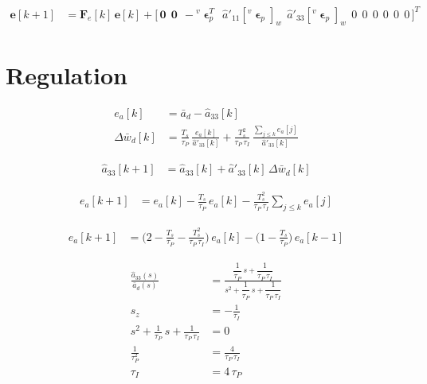 \documentclass[11pt,a4paper]{ctexart}
\newcommand{\T}{T}
\newcommand{\vep}{{}^{v}\bm{\upvarepsilon}_p}
\begin{document}
\vspace{1.2em}
\begin{align*}
\mathbf e[k+1] &= \mathbf F_e[k]\,\mathbf e[k] + \big[\,\mathbf 0\ \ \mathbf 0\ \ -\vep^{\T}\ \ \hat a'_{11}[\vep]_w\ \ \hat a'_{33}[\vep]_w\ \ 0\ \ 0\ \ 0\ \ 0\ \ 0\ \ 0\,\big]^{\T}
\end{align*}

\clearpage
\section{Regulation}

\vspace{1.2em}
\begin{align*}
e_a[k] &= \bar a_d - \hat a_{33}[k] \\[4pt]
\Delta\bar w_d[k] &= \frac{T_s}{\tau_P}\,\frac{e_a[k]}{\hat a'_{33}[k]} + \frac{T_s^2}{\tau_P\,\tau_I}\,\frac{\sum_{j \le k} e_a[j]}{\hat a'_{33}[k]}
\end{align*}

\vspace{2.2em}
\begin{align*}
\hat a_{33}[k+1] &= \hat a_{33}[k] + \hat a'_{33}[k]\,\Delta\bar w_d[k]
\end{align*}

\vspace{2.2em}
\begin{align*}
e_a[k+1] &= e_a[k] - \frac{T_s}{\tau_P}\,e_a[k] - \frac{T_s^2}{\tau_P\,\tau_I}\sum_{j \le k} e_a[j]
\end{align*}

\vspace{2.2em}
\begin{align*}
e_a[k+1] &= \Big(2 - \frac{T_s}{\tau_P} - \frac{T_s^2}{\tau_P\,\tau_I}\Big)\,e_a[k] - \Big(1 - \frac{T_s}{\tau_P}\Big)\,e_a[k-1]
\end{align*}

\vspace{2.2em}
\begin{align*}
\frac{\hat a_{33}(s)}{\bar a_d(s)} &= \frac{\dfrac{1}{\tau_P}\,s + \dfrac{1}{\tau_P\,\tau_I}}{s^2 + \dfrac{1}{\tau_P}\,s + \dfrac{1}{\tau_P\,\tau_I}} \\[8pt]
s_z &= -\frac{1}{\tau_I} \\[4pt]
s^2 + \frac{1}{\tau_P}\,s + \frac{1}{\tau_P\,\tau_I} &= 0 \\[4pt]
\frac{1}{\tau_P^2} &= \frac{4}{\tau_P\,\tau_I} \\[4pt]
\tau_I &= 4\,\tau_P
\end{align*}
\end{document}
